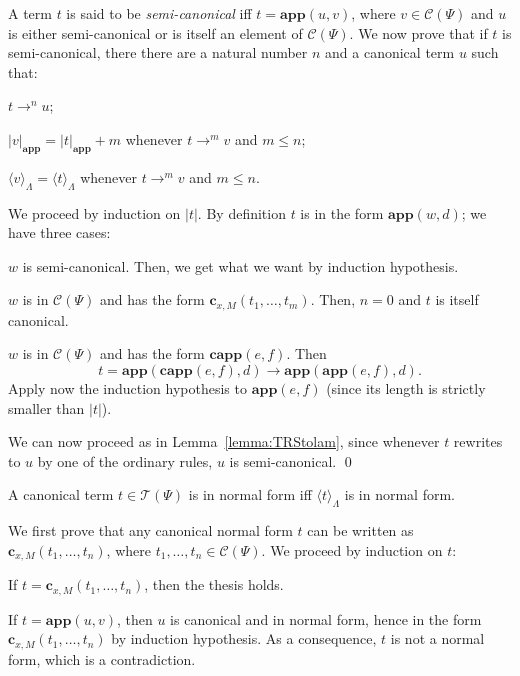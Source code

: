 \documentclass{LMCS}
\newcommand{\varone}{x}
\newcommand{\lambdaone}{M}
\newcommand{\termone}{t}
\newcommand{\termtwo}{u}
\newcommand{\termthree}{v}
\newcommand{\termfour}{w}
\newcommand{\termfive}{d}
\newcommand{\termsix}{e}
\newcommand{\termseven}{f}
\newcommand{\appTRS}{\mathbf{app}}
\newcommand{\cappTRSW}{\mathbf{capp}}
\newcommand{\constr}[2]{\mathbf{c}_{#1,#2}}
\newcommand{\TRSWtolambda}[1]{\langle #1\rangle_{\Lambdaterms}}
\newcommand{\Lambdaterms}{\Lambda}
\newcommand{\TRSWterms}{\mathcal{T}(\Psi)}
\newcommand{\TRSWconterms}{\mathcal{C}(\Psi)}
\newcommand{\rewrTRSW}{\rightarrow}
\newcommand{\length}[1]{|#1|}
\newcommand{\plength}[2]{|#1|_{#2}}
\newenvironment{varitemize}
{
\begin{list}{\labelitemi}
{\setlength{\itemsep}{0.0mm}
 \setlength{\topsep}{0.0mm}
 \setlength{\parindent}{0.0mm}
 \setlength{\parskip}{0.0mm}
 \setlength{\parsep}{0.0mm}
 \setlength{\partopsep}{0.0mm}
 \setlength{\leftmargin}{15pt}
 \setlength{\labelsep}{5pt}
 \setlength{\labelwidth}{10pt}}}
{
 \end{list} 
}
\newcounter{number}
\begin{document}
\proof
A term $\termone$ is said to be \emph{semi-canonical} iff $\termone=\appTRS(\termtwo,\termthree)$, where
$\termthree\in\TRSWconterms$ and $\termtwo$ is either semi-canonical or is itself an element
of $\TRSWconterms$. We now prove that if $\termone$ is semi-canonical, there there are a natural
number $n$ and a canonical term $\termtwo$ such that:
\begin{varitemize}
\item
  $\termone\rewrTRSW^n\termtwo$;
\item
  $\plength{\termthree}{\appTRS}=\plength{\termone}{\appTRS}+m$ whenever $\termone\rewrTRSW^m\termthree$
  and $m\leq n$;
\item
  $\TRSWtolambda{\termthree}=\TRSWtolambda{\termone}$ whenever $\termone\rewrTRSW^m\termthree$
  and $m\leq n$.
\end{varitemize}
We proceed by induction on $\length{\termone}$. By definition $\termone$ is 
in the form $\appTRS(\termfour,\termfive)$; we have three cases:
\begin{varitemize}
\item
  $\termfour$ is semi-canonical. Then, we get what we want by induction hypothesis.
\item
  $\termfour$ is in $\TRSWconterms$ and has the form $\constr{\varone}{\lambdaone}(\termone_1,\ldots,\termone_m)$.
  Then, $n=0$ and $\termone$ is itself canonical.
\item
  $\termfour$ is in $\TRSWconterms$ and has the form $\cappTRSW(\termsix,\termseven)$. Then
  $$
  \termone=\appTRS(\cappTRSW(\termsix,\termseven),\termfive)\rewrTRSW\appTRS(\appTRS(\termsix,\termseven),\termfive).
  $$
  Apply now the induction hypothesis to $\appTRS(\termsix,\termseven)$ (since its length is
  strictly smaller than $\length{\termone}$).
\end{varitemize}
We can now proceed as in Lemma~\ref{lemma:TRStolam}, since whenever
$\termone$ rewrites to $\termtwo$ by one of the ordinary rules, $\termtwo$ is 
semi-canonical.
\qed
\begin{lem}\label{lemma:TRSWnormalform}
A canonical term $\termone\in\TRSWterms$ is in normal form iff $\TRSWtolambda{\termone}$ is in
normal form.
\end{lem}
\proof
We first prove that any canonical normal form $\termone$ can be written
as $\constr{\varone}{\lambdaone}(\termone_1,\ldots,\termone_n)$, where
$\termone_1,\ldots,\termone_n\in\TRSWconterms$. We proceed by induction
on $\termone$:
\begin{varitemize}
\item
  If $\termone=\constr{\varone}{\lambdaone}(\termone_1,\ldots,\termone_n)$,
  then the thesis holds.
\item
  If $\termone=\appTRS(\termtwo,\termthree)$, then $\termtwo$ is canonical
  and in normal form, hence in the form $\constr{\varone}{\lambdaone}(\termone_1,\ldots,\termone_n)$
  by induction hypothesis. As a consequence, $\termone$ is not a normal
  form, which is a contradiction.
\end{varitemize}
\end{document}
